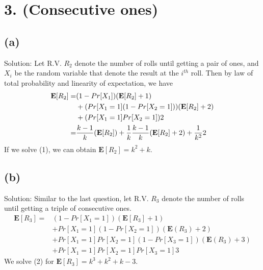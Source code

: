 \documentclass[10pt]{537homework}
\author{Peilun Dai}
\begin{document}
\section*{3. (Consecutive ones) }


\subsection*{(a)} 

Solution: Let R.V. $R_2$ denote the number of rolls until getting a pair of ones, and $X_i$ be the random variable that denote the result at the $i^{th}$ roll. Then by law of total probability and linearity of expectation, we have
\begin{align}
  \mathbf{E}[R_2]     = &(1-Pr[X_1])(\mathbf{E}[R_2]+1)  \nonumber \\
                        & + (Pr[X_1=1](1-Pr[X_2=1]))(\mathbf{E}[R_2]+2) \nonumber \\
                        & + (Pr[X_1=1]Pr[X_2=1])2 \nonumber \\
                      = & {k-1 \over k}(\mathbf{E}[R_2]) 
                          + {1 \over k}{k-1 \over k}(\mathbf{E}[R_2]+2)
                          + {1 \over k^2}2 
\end{align}
If we solve (1), we can obtain $\mathbf{E}[R_2] = k^2 + k$.


\subsection*{(b)} 

Solution: Similar to the last question, let R.V. $R_3$ denote the number of rolls until getting a triple of consecutive ones. 
\begin{align}
  \mathbf{E}[R_3]   =   & (1-Pr[X_1=1])(\mathbf{E}[R_3]+1)  \nonumber \\
                        & + Pr[X_1=1](1-Pr[X_2=1])(\mathbf{E}(R_3) + 2) \nonumber \\
                        & + Pr[X_1=1]Pr[X_2=1](1-Pr[X_3=1])(\mathbf{E}(R_3) + 3) \nonumber \\
                        & + Pr[X_1=1]Pr[X_2=1]Pr[X_3=1]3
\end{align}
We solve (2) for $\mathbf{E}[R_3] = k^3 + k^2 + k - 3$. 
\end{document}
